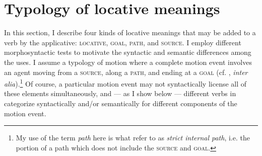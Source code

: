 \documentclass[output=paper]{langsci/langscibook}
\begin{document}
\section{Typology of locative meanings}%
\label{sec:jerro:3}
In this section, I describe four kinds of locative meanings that may be added to a verb by the applicative: {\scshape locative, goal, path}, and {\scshape source}. I employ different morphosyntactic tests to motivate the syntactic and semantic differences among the uses.  I assume a typology of motion where a complete motion event involves an agent moving from a {\scshape source}, along a {\scshape path}, and ending at a {\scshape goal} (cf. \citealt{talmy:1975,slobin:1996,zlatevy:2004,beaversetal:2009}, \emph{inter alia}).\footnote{My use of the term \emph{path} here is what \citet{ashersablay:1995} refer to as \emph{strict internal path}, i.e. the portion of a path which does not include the {\scshape source} and {\scshape goal}.} Of course, a particular motion event may not syntactically license  all of these elements simultaneously, and --- as I show below --- different verbs in  categorize syntactically and/or semantically for different components of the motion event. 

\end{document}
